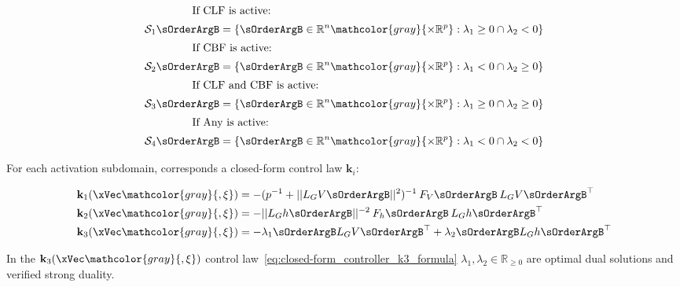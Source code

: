 \begin{align}
    \intertext{\hspace{4em} If CLF is active: }
    \mathcal{S}_1 \sOrderArgB = \{ \sOrderArgB \in \mathbb{R}^n \mathcolor{gray}{\times \mathbb{R}^p}: \lambda_1 \geq 0 \cap \lambda_2 < 0 \}
    \label{eq:Constraints_Activation_Subdomain_1} \\
    \intertext{\hspace{4em} If CBF is active:}
    \mathcal{S}_2 \sOrderArgB = \{ \sOrderArgB \in \mathbb{R}^n \mathcolor{gray}{\times \mathbb{R}^p}: \lambda_1 < 0 \cap \lambda_2 \geq 0 \}
    \label{eq:Constraints_Activation_Subdomain_2} \\
    \intertext{\hspace{4em} If CLF and CBF is active:}
    \mathcal{S}_3 \sOrderArgB = \{ \sOrderArgB \in \mathbb{R}^n \mathcolor{gray}{\times \mathbb{R}^p}: \lambda_1 \geq 0 \cap \lambda_2 \geq 0 \}
    \label{eq:Constraints_Activation_Subdomain_3} \\
    \intertext{\hspace{4em} If Any is active:}
    \mathcal{S}_4\sOrderArgB = \{ \sOrderArgB \in \mathbb{R}^n \mathcolor{gray}{\times \mathbb{R}^p}: \lambda_1 < 0 \cap \lambda_2 < 0 \}
    \label{eq:Constraints_Activation_Subdomain_4} 
\end{align}


For each activation subdomain, corresponds a closed-form control law \(\mathbf{k}_i\):

\begin{align}
    &\mathbf{k}_1(\xVec \mathcolor{gray}{, \mathbf{\xi}}) = -(p^{-1} + ||L_GV \sOrderArgB||^2)^{-1} \hspace{0.2em} F_V\sOrderArgB \hspace{0.2em} L_GV\sOrderArgB^{\top} \label{eq:closed-form_controller_k1_formula} \\ 
    &\mathbf{k}_2(\xVec \mathcolor{gray}{, \mathbf{\xi}}) = -||L_Gh \sOrderArgB||^{-2} \hspace{0.2em} F_h \sOrderArgB \hspace{0.2em} L_Gh \sOrderArgB^{\top}  \label{eq:closed-form_controller_k2_formula}\\ 
    &\mathbf{k}_3(\xVec \mathcolor{gray}{, \mathbf{\xi}}) = -\lambda_1\sOrderArgB L_GV \sOrderArgB^{\top} + \lambda_2\sOrderArgB L_Gh \sOrderArgB^{\top} \label{eq:closed-form_controller_k3_formula}
\end{align}

In the \(\mathbf{k}_3(\xVec \mathcolor{gray}{, \mathbf{\xi}})\) control law~\eqref{eq:closed-form_controller_k3_formula} \(\lambda_1, \lambda_2 \in \mathbb{R}_{\geq 0}\) are optimal dual solutions and verified strong duality. 

